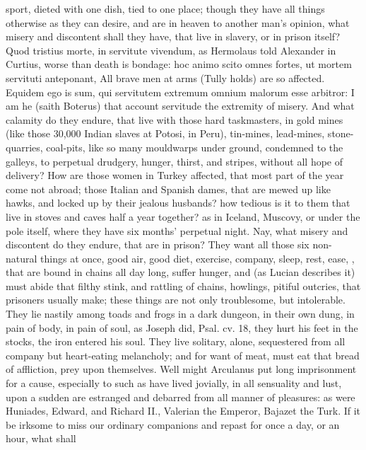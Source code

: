 {sport, dieted with one dish, tied to one place; though they have all
things otherwise as they can desire, and are in heaven to another man's
opinion, what misery and discontent shall they have, that live in
slavery, or in prison itself? Quod tristius morte, in servitute
vivendum, as Hermolaus told Alexander in Curtius, worse than
death is bondage: hoc animo scito omnes fortes, ut mortem
servituti anteponant, All brave men at arms (Tully holds) are so
affected. Equidem ego is sum, qui servitutem extremum omnium
malorum esse arbitror: I am he (saith Boterus) that account servitude
the extremity of misery. And what calamity do they endure, that live
with those hard taskmasters, in gold mines (like those 30,000
Indian slaves at Potosi, in Peru), tin-mines, lead-mines,
stone-quarries, coal-pits, like so many mouldwarps under ground,
condemned to the galleys, to perpetual drudgery, hunger, thirst, and
stripes, without all hope of delivery? How are those women in Turkey
affected, that most part of the year come not abroad; those Italian and
Spanish dames, that are mewed up like hawks, and locked up by their
jealous husbands? how tedious is it to them that live in stoves and
caves half a year together? as in Iceland, Muscovy, or under the
pole itself, where they have six months' perpetual night. Nay,
what misery and discontent do they endure, that are in prison? They
want all those six non-natural things at once, good air, good diet,
exercise, company, sleep, rest, ease, \etc{}, that are bound in chains all
day long, suffer hunger, and (as Lucian describes it) must abide
that filthy stink, and rattling of chains, howlings, pitiful outcries,
that prisoners usually make; these things are not only troublesome, but
intolerable. They lie nastily among toads and frogs in a dark dungeon,
in their own dung, in pain of body, in pain of soul, as Joseph did,
Psal. cv. 18, they hurt his feet in the stocks, the iron entered his
soul. They live solitary, alone, sequestered from all company but
heart-eating melancholy; and for want of meat, must eat that bread of
affliction, prey upon themselves. Well might Arculanus put long
imprisonment for a cause, especially to such as have lived jovially, in
all sensuality and lust, upon a sudden are estranged and debarred from
all manner of pleasures: as were Huniades, Edward, and Richard II.,
Valerian the Emperor, Bajazet the Turk. If it be irksome to miss our
ordinary companions and repast for once a day, or an hour, what shall
}
